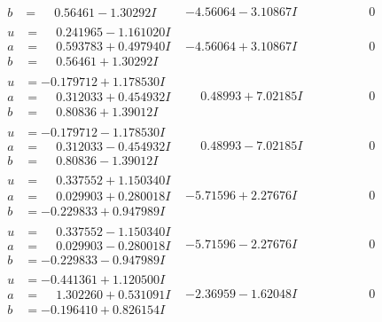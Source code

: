 \documentclass[1p]{elsarticle_modified}
\theoremstyle{definition}
\begin{document}
$$\begin{array}{c|c|c}
\begin{aligned}
b &= \phantom{-}0.56461 - 1.30292 I\end{aligned}
 & -4.56064 - 3.10867 I & \phantom{-0.000000 } 0 \\ \hline\begin{aligned}
u &= \phantom{-}0.241965 - 1.161020 I \\
a &= \phantom{-}0.593783 + 0.497940 I \\
b &= \phantom{-}0.56461 + 1.30292 I\end{aligned}
 & -4.56064 + 3.10867 I & \phantom{-0.000000 } 0 \\ \hline\begin{aligned}
u &= -0.179712 + 1.178530 I \\
a &= \phantom{-}0.312033 + 0.454932 I \\
b &= \phantom{-}0.80836 + 1.39012 I\end{aligned}
 & \phantom{-}0.48993 + 7.02185 I & \phantom{-0.000000 } 0 \\ \hline\begin{aligned}
u &= -0.179712 - 1.178530 I \\
a &= \phantom{-}0.312033 - 0.454932 I \\
b &= \phantom{-}0.80836 - 1.39012 I\end{aligned}
 & \phantom{-}0.48993 - 7.02185 I & \phantom{-0.000000 } 0 \\ \hline\begin{aligned}
u &= \phantom{-}0.337552 + 1.150340 I \\
a &= \phantom{-}0.029903 + 0.280018 I \\
b &= -0.229833 + 0.947989 I\end{aligned}
 & -5.71596 + 2.27676 I & \phantom{-0.000000 } 0 \\ \hline\begin{aligned}
u &= \phantom{-}0.337552 - 1.150340 I \\
a &= \phantom{-}0.029903 - 0.280018 I \\
b &= -0.229833 - 0.947989 I\end{aligned}
 & -5.71596 - 2.27676 I & \phantom{-0.000000 } 0 \\ \hline\begin{aligned}
u &= -0.441361 + 1.120500 I \\
a &= \phantom{-}1.302260 + 0.531091 I \\
b &= -0.196410 + 0.826154 I\end{aligned}
 & -2.36959 - 1.62048 I & \phantom{-0.000000 } 0 \\ \hline\begin{aligned}

\end{aligned}
\end{array}$$
\end{document}
